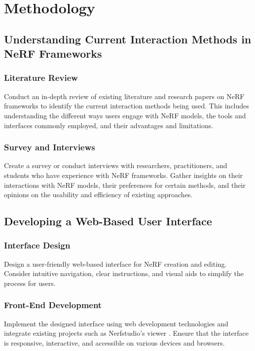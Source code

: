 \section{Methodology}
\label{sec:intro:methodology}

\subsection{Understanding Current Interaction Methods in NeRF Frameworks}

\subsubsection{Literature Review}
Conduct an in-depth review of existing literature and research papers on NeRF frameworks to identify the current interaction methods being used. This includes understanding the different ways users engage with NeRF models, the tools and interfaces commonly employed, and their advantages and limitations.

\subsubsection{Survey and Interviews}
Create a survey or conduct interviews with researchers, practitioners, and students who have experience with NeRF frameworks. Gather insights on their interactions with NeRF models, their preferences for certain methods, and their opinions on the usability and efficiency of existing approaches.

\subsection{Developing a Web-Based User Interface}

\subsubsection{Interface Design}
Design a user-friendly web-based interface for NeRF creation and editing. Consider intuitive navigation, clear instructions, and visual aids to simplify the process for users.

\subsubsection{Front-End Development}
Implement the designed interface using web development technologies and integrate existing projects such as Nerfstudio's viewer \cite{nerfstudio}. Ensure that the interface is responsive, interactive, and accessible on various devices and browsers.

